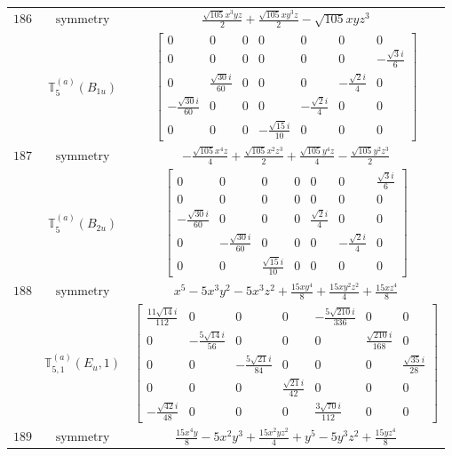 \documentclass[fleqn,8pt,landscape]{jsarticle}
\begin{document}
\begin{longtable}{ccc}
$ 186 $ & $ \text{symmetry} $ & $ \frac{\sqrt{105} x^{3} y z}{2} + \frac{\sqrt{105} x y^{3} z}{2} - \sqrt{105} x y z^{3} $ \\
$  $ & $ \mathbb{T}_{5}^{(a)}(B_{1u}) $ & $ \begin{bmatrix} 0 & 0 & 0 & 0 & 0 & 0 & 0 \\ 0 & 0 & 0 & 0 & 0 & 0 & - \frac{\sqrt{3} i}{6} \\ 0 & \frac{\sqrt{30} i}{60} & 0 & 0 & 0 & - \frac{\sqrt{2} i}{4} & 0 \\ - \frac{\sqrt{30} i}{60} & 0 & 0 & 0 & - \frac{\sqrt{2} i}{4} & 0 & 0 \\ 0 & 0 & 0 & - \frac{\sqrt{15} i}{10} & 0 & 0 & 0 \end{bmatrix} $ \\ \hline
$ 187 $ & $ \text{symmetry} $ & $ - \frac{\sqrt{105} x^{4} z}{4} + \frac{\sqrt{105} x^{2} z^{3}}{2} + \frac{\sqrt{105} y^{4} z}{4} - \frac{\sqrt{105} y^{2} z^{3}}{2} $ \\
$  $ & $ \mathbb{T}_{5}^{(a)}(B_{2u}) $ & $ \begin{bmatrix} 0 & 0 & 0 & 0 & 0 & 0 & \frac{\sqrt{3} i}{6} \\ 0 & 0 & 0 & 0 & 0 & 0 & 0 \\ - \frac{\sqrt{30} i}{60} & 0 & 0 & 0 & \frac{\sqrt{2} i}{4} & 0 & 0 \\ 0 & - \frac{\sqrt{30} i}{60} & 0 & 0 & 0 & - \frac{\sqrt{2} i}{4} & 0 \\ 0 & 0 & \frac{\sqrt{15} i}{10} & 0 & 0 & 0 & 0 \end{bmatrix} $ \\ \hline
$ 188 $ & $ \text{symmetry} $ & $ x^{5} - 5 x^{3} y^{2} - 5 x^{3} z^{2} + \frac{15 x y^{4}}{8} + \frac{15 x y^{2} z^{2}}{4} + \frac{15 x z^{4}}{8} $ \\
$  $ & $ \mathbb{T}_{5,1}^{(a)}(E_{u},1) $ & $ \begin{bmatrix} \frac{11 \sqrt{14} i}{112} & 0 & 0 & 0 & - \frac{5 \sqrt{210} i}{336} & 0 & 0 \\ 0 & - \frac{5 \sqrt{14} i}{56} & 0 & 0 & 0 & \frac{\sqrt{210} i}{168} & 0 \\ 0 & 0 & - \frac{5 \sqrt{21} i}{84} & 0 & 0 & 0 & \frac{\sqrt{35} i}{28} \\ 0 & 0 & 0 & \frac{\sqrt{21} i}{42} & 0 & 0 & 0 \\ - \frac{\sqrt{42} i}{48} & 0 & 0 & 0 & \frac{3 \sqrt{70} i}{112} & 0 & 0 \end{bmatrix} $ \\ \hline
$ 189 $ & $ \text{symmetry} $ & $ \frac{15 x^{4} y}{8} - 5 x^{2} y^{3} + \frac{15 x^{2} y z^{2}}{4} + y^{5} - 5 y^{3} z^{2} + \frac{15 y z^{4}}{8} $ \\

\end{longtable}
\end{document}

